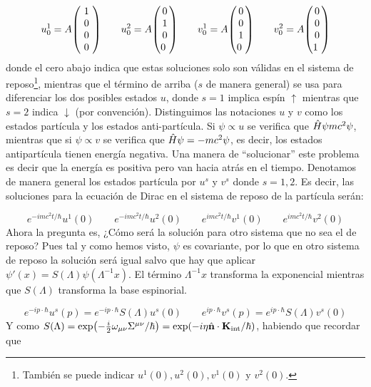 \begin{equation}
	u_0^1 = A \mqty(1\\0\\0\\ \ 0 \ ) \qquad  u_0^2 =A \mqty(0\\1\\0\\0\ ) \qquad v_0^1 = A \mqty(0\\0\\1\\0 \ ) \qquad v_0^2 =A \mqty(0\\0\\0\\1 \ )
\end{equation}
donde el cero abajo indica que estas soluciones solo son válidas en el sistema de reposo\footnote{También se puede indicar $u^1(0),u^2(0),v^1(0)$ y $v^2(0)$.}, mientras que el término de arriba ($s$ de manera general) se usa para diferenciar los dos posibles estados $u$, donde $s=1$ implica espín $\uparrow$ mientras que $s=2$ indica $\downarrow$ (por convención). Distinguimos las notaciones $u$ y $v$ como los estados partícula y los estados anti-partícula. Si $\psi \propto u$ se verifica que $\hat{H} \psi mc^2\psi$, mientras que si $\psi \propto v $ se verifica que $\hat{H} \psi = - mc^2 \psi$, es decir, los estados antipartícula tienen energía negativa. Una manera de ``solucionar'' este problema es decir que la energía es positiva pero van hacia atrás en el tiempo. Denotamos de manera general los estados partícula por $u^s$ y $v^s$ donde $s=1,2$. Es decir, las soluciones para la ecuación de Dirac en el sistema de reposo de la partícula serán:


\begin{equation}
	e^{-imc^2t/\hbar} u^1(0) \qquad 	e^{-imc^2t/\hbar}  u^2(0) \qquad 	e^{imc^2t/\hbar}  v^1(0)  \qquad e^{imc^2t/\hbar}  v^2(0) 
\end{equation}
Ahora la pregunta es, ¿Cómo será la solución para otro sistema que no sea el de reposo? Pues tal y como hemos visto, $\psi$ es covariante, por lo que en otro sistema de reposo la solución será igual salvo que hay que aplicar $\psi'(x)=S(\Lambda)\psi(\Lambda^{-1}x)$. El término $\Lambda^{-1}x$ transforma la exponencial mientras que $S(\Lambda)$ transforma la base espinorial.

\begin{equation}
	e^{-ip\cdot \hbar}u^s(p) = 	e^{-ip\cdot \hbar} S(\Lambda) u^s(0) \qquad 	e^{ip\cdot \hbar} v^s(p) = 	e^{ip\cdot \hbar} S(\Lambda) v^s (0)
\end{equation}
Y como $S(\Lambda)=\exp(-\frac{i}{2} \omega_{\mu \nu}\Sigma^{\mu \nu}/\hbar)=\exp(-i\eta \hat{\mathbf{n}}\cdot \mathbf{K}_{\text{int}} / \hbar)$, habiendo que recordar que

